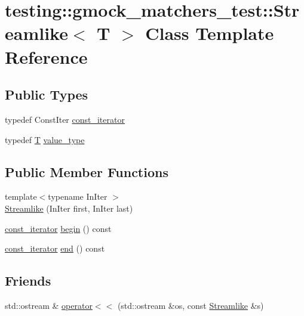 \hypertarget{classtesting_1_1gmock__matchers__test_1_1_streamlike}{}\section{testing\+:\+:gmock\+\_\+matchers\+\_\+test\+:\+:Streamlike$<$ T $>$ Class Template Reference}
\label{classtesting_1_1gmock__matchers__test_1_1_streamlike}
\subsection*{Public Types}
\begin{DoxyCompactItemize}
\item 
typedef Const\+Iter \hyperlink{classtesting_1_1gmock__matchers__test_1_1_streamlike_a2eeb61dca56f70d0266f5f8ae91d2c7b}{const\+\_\+iterator}
\item 
typedef \hyperlink{functions__7_8js_adf1f3edb9115acb0a1e04209b7a9937b}{T} \hyperlink{classtesting_1_1gmock__matchers__test_1_1_streamlike_a7e2c2e021676c1ed5dea63cdd019661c}{value\+\_\+type}
\end{DoxyCompactItemize}
\subsection*{Public Member Functions}
\begin{DoxyCompactItemize}
\item 
{\footnotesize template$<$typename In\+Iter $>$ }\\\hyperlink{classtesting_1_1gmock__matchers__test_1_1_streamlike_abf5560c86ad5d9563cb8f477f06046fe}{Streamlike} (In\+Iter first, In\+Iter last)
\item 
\hyperlink{classtesting_1_1gmock__matchers__test_1_1_streamlike_a2eeb61dca56f70d0266f5f8ae91d2c7b}{const\+\_\+iterator} \hyperlink{classtesting_1_1gmock__matchers__test_1_1_streamlike_a7689965f60343bcecd1ebdbd18462cb4}{begin} () const 
\item 
\hyperlink{classtesting_1_1gmock__matchers__test_1_1_streamlike_a2eeb61dca56f70d0266f5f8ae91d2c7b}{const\+\_\+iterator} \hyperlink{classtesting_1_1gmock__matchers__test_1_1_streamlike_a55016d4cf006a9ef2dedb0a389ce8026}{end} () const 
\end{DoxyCompactItemize}
\subsection*{Friends}
\begin{DoxyCompactItemize}
\item 
std\+::ostream \& \hyperlink{classtesting_1_1gmock__matchers__test_1_1_streamlike_a4b45ba8c2a5ee61697003f02568df91f}{operator$<$$<$} (std\+::ostream \&os, const \hyperlink{classtesting_1_1gmock__matchers__test_1_1_streamlike}{Streamlike} \&s)
\end{DoxyCompactItemize}


